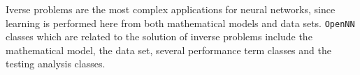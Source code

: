 Iverse problems are the most complex applications for neural networks, 
since learning is performed here from both mathematical models and data sets. 
\texttt{OpenNN} classes which are related to the solution of inverse problems include the mathematical model, the data set,  
several performance term classes and the testing analysis classes. 

